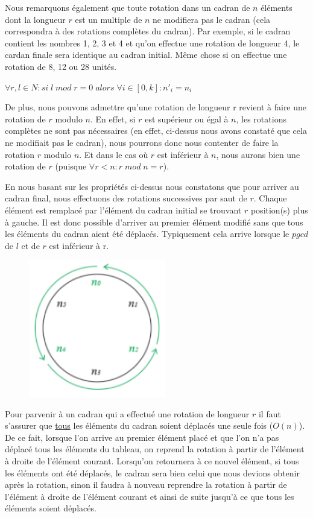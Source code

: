 	Nous remarquons également que toute rotation dans un cadran de $n$ éléments dont la longueur $r$ est un multiple de $n$ ne modifiera pas le cadran (cela correspondra à des rotations complètes du cadran). Par exemple, si le cadran contient les nombres 1, 2, 3 et 4 et qu’on effectue une rotation de longueur 4, le cardan finale sera identique au cadran initial. Même chose si on effectue une rotation de 8, 12 ou 28 unités.
	
	$ \forall r, l \in N : si \; l \; mod \; r = 0 \; alors \; \forall i \in [0, k]:n'_i = n_i $ 
	
	De plus, nous pouvons admettre qu’une rotation de longueur r revient à faire une rotation de $r$ modulo $n$. En effet, si $r$ est supérieur ou égal à $n$, les rotations complètes ne sont pas nécessaires (en effet, ci-dessus nous avons constaté que cela ne modifiait pas le cadran), nous pourrons donc nous contenter de faire la rotation $r$ modulo $n$. Et dans le cas où $r$ est inférieur à $n$, nous aurons bien une rotation de $r$ (puisque $\forall r<n: r \; mod \; n = r$).
	
	En nous basant sur les propriétés ci-dessus nous constatons que pour arriver au cadran final, nous effectuons des rotations successives par saut de $r$. Chaque élément est remplacé par l’élément du cadran initial se trouvant $r$ position(s) plus à gauche. Il est donc possible d’arriver au premier élément modifié sans que tous les éléments du cadran aient été déplacés. Typiquement cela arrive lorsque le $pgcd$ de $l$ et de $r$ est inférieur à r.
		\begin{figure}[h]
			\centering
			\includegraphics[height=6cm]{5}
			\caption{}
		\end{figure}	

	Pour parvenir à un cadran qui a effectué une rotation de longueur $r$ il faut s’assurer que \underline{tous} les éléments du cadran soient déplacés une seule fois ($O(n)$). De ce fait, lorsque l’on arrive au premier élément placé et que l’on n’a pas déplacé tous les éléments du tableau, on reprend la rotation à partir de l’élément à droite de l’élément courant. Lorsqu’on retournera à ce nouvel élément, si tous les éléments ont été déplacés, le cadran sera bien celui que nous devions obtenir après la rotation, sinon il faudra à nouveau reprendre la rotation à partir de l’élément à droite de l’élément courant et ainsi de suite jusqu’à ce que tous les éléments soient déplacés.
	
